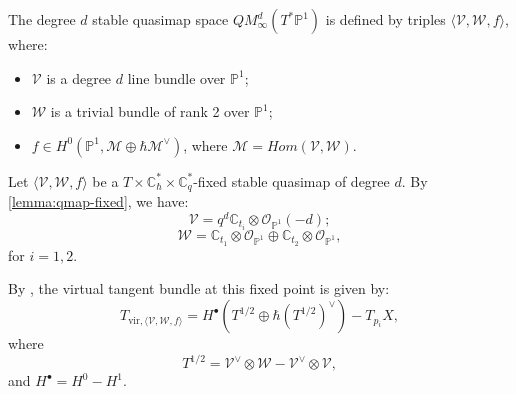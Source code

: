 \documentclass{amsart}
\begin{document}
The degree $d$ stable quasimap space $QM_{\infty}^d( T^*\mathbb{P}^1)$ is defined by triples $\langle \mathcal{V},\mathcal{W},f \rangle$, where:

\begin{itemize}
    \item   $\mathcal{V}$ is a degree $d$ line bundle over $\mathbb{P}^1$;
    \item   $\mathcal{W}$ is a trivial bundle of rank 2 over $\mathbb{P}^1$;
    \item   $f \in H^0(\mathbb{P}^1,\mathcal{M} \oplus \hbar \mathcal{M}^{\vee})$, where $\mathcal{M} = Hom(\mathcal{V}, \mathcal{W})$. 
\end{itemize}
Let $\langle\mathcal{V},\mathcal{W},f\rangle$ be a $T \times \mathbb{C}^*_{\hbar} \times \mathbb{C}^*_q$-fixed stable quasimap of degree $d$. By \cref{lemma:qmap-fixed}, we have:
\begin{equation}\label{fixed quasimap}
    \mathcal{V} = q^d\mathbb{C}_{t_i}\otimes \mathcal{O}_{\mathbb{P}^1}(-d);
\end{equation}
\[
\mathcal{W} = \mathbb{C}_{t_1}\otimes \mathcal{O}_{\mathbb{P}^1} \oplus \mathbb{C}_{t_2}\otimes \mathcal{O}_{\mathbb{P}^1},
\]
for $i=1,2$.

  By , the virtual tangent bundle at this fixed point is given by: 
 \[
 T_{\mathrm{vir},\langle \mathcal{V},\mathcal{W},f \rangle} = H^{\bullet}(T^{1/2} \oplus \hbar(T^{1/2})^{\vee})- T_{p_i}X,
 \]
where 
\[
T^{1/2} = \mathcal{V}^{\vee} \otimes \mathcal{W} - \mathcal{V}^{\vee} \otimes \mathcal{V},
\]
and $H^{\bullet} = H^0 - H^1$.
\end{document}
